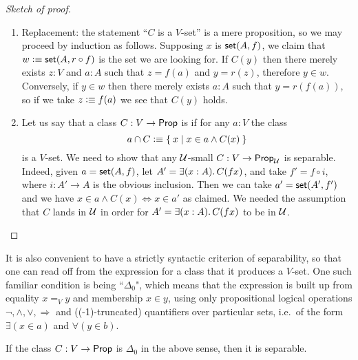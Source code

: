 \begin{proof}[Sketch of proof]
\begin{enumerate}
  \item Replacement: the statement ``$C$ is a $V$-set'' is a mere proposition, so we may
    proceed by induction as follows. Supposing $x$ is $\mathsf{set}(A, f)$, we claim that $w
    \vcentcolon\equiv \mathsf{set}(A, r \circ f)$ is the set we are looking for.  If $C(y)$ then there merely exists
    $z : V$ and $a : A$ such that $z = f(a)$ and $y = r(z)$, therefore $y \in w$.
    Conversely, if $y \in w$ then there merely exists $a : A$ such that $y = r(f(a))$, so
    if we take $z \vcentcolon\equiv f(a)$ we see that $C(y)$ holds.

\item Let us say that a class $C: V\to\mathsf{Prop}$ is  if for any $a:V$ the class $$a\cap C \vcentcolon\equiv\Set{x | x\in a \wedge C(x)}$$ is a $V$-set.
We need to show that any $\mathcal{U}$-small  $C: V \to \mathsf{Prop}_\mathcal{U}$ is separable. Indeed, given $a=\mathsf{set}(A,f)$, let $A' = \exis{x:A}C(fx)$, and take $f' = f\circ i$, where $i : A' \to A$ is the obvious inclusion.  Then we can take $a' = \mathsf{set}(A',f')$ and we have $x\in a\wedge C(x) \Leftrightarrow x\in a'$ as claimed.  We needed the assumption that $C$ lands in $\mathcal{U}$ in order for $A' = \exis{x:A}C(fx)$ to be in $\mathcal{U}$.\qedhere
\end{enumerate}
\end{proof}

It is also convenient to have a strictly syntactic criterion of separability, so that one can read off from the expression for a class that it produces a $V$-set.  One such familiar condition is being ``$\Delta_0$", which means that the expression is built up from equality $x=_V y$ and membership $x\in y$, using only propositional logical operations $\neg, \land, \lor, \Rightarrow$ and ((-1)-truncated) quantifiers over particular sets, i.e.\ of the form $\exists(x\in a)$ and $\forall(y\in b)$.  

\begin{cor}\label{cor:Delta0sep}
If the class $C: V \to \mathsf{Prop}$ is $\Delta_0$ in the above sense, then it is separable.
\end{cor}


